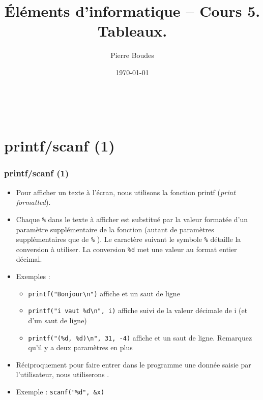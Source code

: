 \documentclass[xcolor=pdftex,svgnames,table]{beamer}
\title{Éléments d'informatique -- Cours 5. Tableaux.
}
\author{Pierre Boudes}
\date{\today}
\begin{document}
\begin{frame}
	\titlepage
	\vfill
	\begin{center}
		\\[2.5ex]
		{\tiny\CcNote{\CcLongnameByNcSa}}
		\vspace*{-2.5ex}
	\end{center}
\end{frame}

\section[Plan]{}
\frame[label=plan]{\tableofcontents}

\section{printf/scanf (1)}
\begin{frame}[fragile]
  \frametitle{printf/scanf (1)}
\begin{itemize}
\item  Pour afficher un texte à l'écran, nous utilisons la fonction \alert{printf}
  (\emph{print formatted}). 
\item Chaque \verb+%+
  dans le texte à afficher est substitué par la valeur formatée d'un
  \alert{paramètre supplémentaire} de la fonction (autant de
  paramètres supplémentaires que de \verb+%+
). Le caractère suivant le symbole \verb+%+
  détaille la conversion à utiliser.  La conversion \verb+%d+
  met une valeur au format \alert{entier décimal}.  \pause
\item Exemples :
  \begin{itemize}
\item
    \verb+printf("Bonjour\n")+ 
affiche  et un saut de
    ligne\pause
\item
    \verb+printf("i vaut %d\n", i)+ 
affiche  suivi de la valeur décimale de i (et d'un saut de
ligne)\pause
\item
    \verb+printf("(%d, %d)\n", 31, -4)+ 
affiche  et un saut de ligne. Remarquez qu'il y a deux
paramètres en plus
 \end{itemize}
\pause
\item Réciproquement pour faire entrer dans le programme une donnée saisie par
  l'utilisateur, nous utiliserons \alert{}.
\item Exemple : \verb+scanf("%d", &x)+
\end{itemize}
\end{frame}
\end{document}
